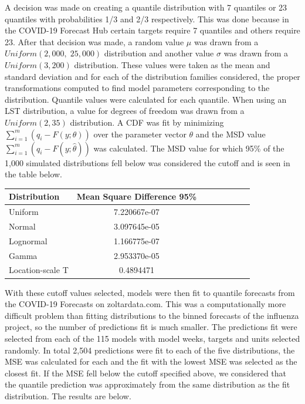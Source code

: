 \documentclass{article}\usepackage[]{graphicx}\usepackage[]{color}
\begin{document}
A decision was made on creating a quantile distribution with 7 quantiles or 23
quantiles with probabilities 1/3 and 2/3 respectively. This was done because 
in the COVID-19 Forecast Hub certain targets require 7 quantiles and others 
require 23. After that decision was made, a random value $\mu$ was drawn from
a $Uniform(2,000,\; 25,000)$ distribution and another value $\sigma$ was drawn
from a $Uniform(3, 200)$ distribution. These values were taken as the mean and
standard deviation and for each of the distribution families considered, the
proper transformations computed to find model parameters corresponding to the 
distribution. Quantile values were calculated for each quantile. When using an 
LST distribution, a value for degrees of freedom was drawn from a 
$Uniform(2,35)$ distribution. A CDF
was fit by minimizing $\sum_{i=1}^m (q_i - F(y; \theta))$ over the parameter
vector $\theta$ and the MSD value $\sum_{i=1}^m (q_i - F(y; \hat{\theta}))$ was 
calculated. The MSD value for which 95\% of the 1,000 simulated distributions
fell below was considered the cutoff and is seen in the table below.

\begin{table}[h!]
  \centering
  \begin{tabular}{l*{6}{c}r}
  Distribution          & Mean Square Difference 95\%  \\
  \hline
  Uniform               & 7.220667e-07   \\
  Normal                & 3.097645e-05  \\
  Lognormal             & 1.166775e-07  \\
  Gamma                 & 2.953370e-05  \\
  Location-scale T      & 0.4894471 \\
  \end{tabular}
\end{table}


With these cutoff values selected, models were then fit to quantile forecasts
from the COVID-19 Forecasts on zoltardata.com. This was a computationally more
difficult problem than fitting distributions to the binned forecasts of the 
influenza project, so the number of predictions fit is much smaller. The 
predictions fit were selected from each of the 115 models with model weeks, 
targets and units selected randomly. In total 2,504 predictions were fit to each
of the five distributions, the MSE was calculated for each and the fit with the
lowest MSE was selected as the closest fit. If the MSE fell below the cutoff
specified above, we considered that the quantile prediction was approximately
from the same distribution as the fit distribution. The results are below.
\end{document}
